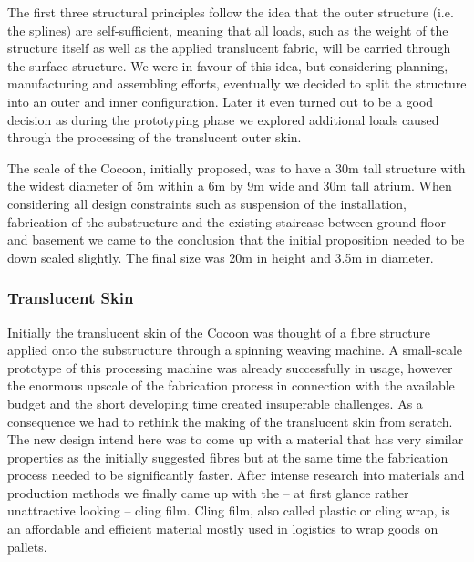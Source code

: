 The first three structural principles follow the idea that the outer structure (i.e. the splines) are self-sufficient, meaning that all loads, such as the weight of the structure itself as well as the applied translucent fabric, will be carried through the surface structure. We were in favour of this idea, but considering planning, manufacturing and assembling efforts, eventually we decided to split the structure into an outer and inner configuration. Later it even turned out to be a good decision as during the prototyping phase we explored additional loads caused through the processing of the translucent outer skin.        

The scale of the Cocoon, initially proposed, was to have a 30m tall structure with the widest diameter of 5m within a 6m by 9m wide and 30m tall atrium. When considering all design constraints such as suspension of the installation, fabrication of the substructure and the existing staircase between ground floor and basement we came to the conclusion that the initial proposition needed to be down scaled slightly. The final size was 20m in height and 3.5m in diameter.

\subsubsection*{Translucent Skin}

Initially the translucent skin of the Cocoon was thought of a fibre structure applied onto the substructure through a spinning weaving machine. A small-scale prototype of this processing machine was already successfully in usage, however the enormous upscale of the fabrication process in connection with the available budget and the short developing time created insuperable challenges. As a consequence we had to rethink the making of the translucent skin from scratch. The new design intend here was to come up with a material that has very similar properties as the initially suggested fibres but at the same time the fabrication process needed to be significantly faster. After intense research into materials and production methods we finally came up with the – at first glance rather unattractive looking – cling film. Cling film, also called plastic or cling wrap, is an affordable and efficient material mostly used in logistics to wrap goods on pallets.

